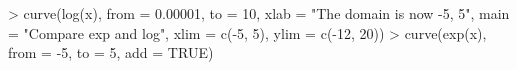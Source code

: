 \begin{Schunk}
\begin{Sinput}
> curve(log(x), from = 0.00001, to = 10, xlab = "The domain is now -5, 5", main = "Compare exp and log", xlim = c(-5, 5), ylim = c(-12, 20))
> curve(exp(x), from = -5, to = 5, add = TRUE)
\end{Sinput}
\end{Schunk}
